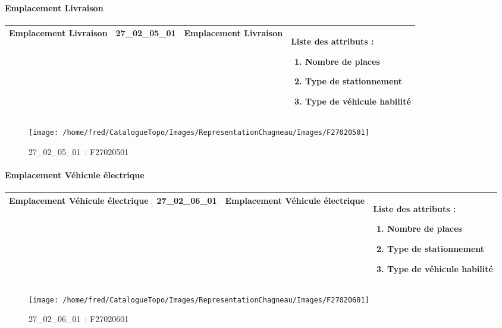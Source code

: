 \documentclass[12pt,titlepage,oneside]{book}
\begin{document}
\paragraph{Emplacement Livraison}
\noindent
\vspace{\baselineskip}

\renewcommand{\arraystretch}{1.2}
\begin{supertabular}{|p{10cm}|c|p{13cm}|p{12cm}|}
 Emplacement Livraison & 27\_02\_05\_01 & Emplacement Livraison & Liste des attributs :
\begin{enumerate}
  \item Nombre de places  \item Type de stationnement  \item Type de véhicule habilité\end{enumerate}
\\
\hline
\end{supertabular}
\begin{figure}[h!]
  \hfill         %
  \begin{minipage}[t]{3cm}
    \begin{center}
      \texttt{[image: /home/fred/CatalogueTopo/Images/RepresentationChagneau/Images/F27020501]}
      \caption[~27\_02\_05\_01]{\small{27\_02\_05\_01~:} \tiny{F27020501}}\label{F27020501}
    \end{center}
  \end{minipage}
\end{figure}


\paragraph{Emplacement Véhicule électrique}
\noindent
\vspace{\baselineskip}

\renewcommand{\arraystretch}{1.2}
\begin{supertabular}{|p{10cm}|c|p{13cm}|p{12cm}|}
 Emplacement Véhicule électrique & 27\_02\_06\_01 & Emplacement Véhicule électrique & Liste des attributs :
\begin{enumerate}
  \item Nombre de places  \item Type de stationnement  \item Type de véhicule habilité\end{enumerate}
\\
\hline
\end{supertabular}
\begin{figure}[h!]
  \hfill         %
  \begin{minipage}[t]{3cm}
    \begin{center}
      \texttt{[image: /home/fred/CatalogueTopo/Images/RepresentationChagneau/Images/F27020601]}
      \caption[~27\_02\_06\_01]{\small{27\_02\_06\_01~:} \tiny{F27020601}}\label{F27020601}
    \end{center}
  \end{minipage}
\end{figure}
\end{document}
